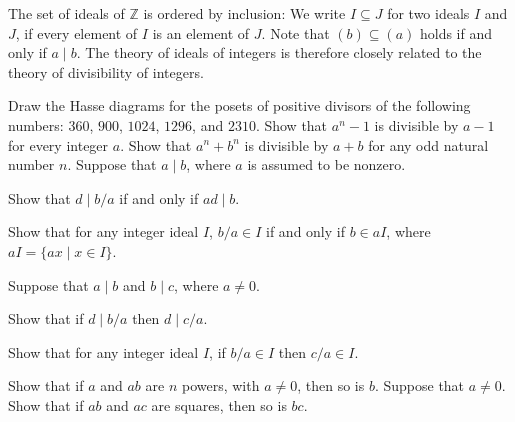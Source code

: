 The set of ideals of $\mathbb{Z}$ is ordered by inclusion: We write $I\subseteq J$ for two ideals $I$ and $J$, if every element of $I$ is an element of $J$. Note that $(b)\subseteq (a)$ holds if and only if $a\mid b$. The theory of ideals of integers is therefore closely related to the theory of divisibility of integers.

\exercises

\begin{starter}
  \exercise Draw the Hasse diagrams for the posets of positive divisors of the following numbers: $360$, $900$, $1024$, $1296$, and $2310$.
  \exercise Show that $a^n-1$ is divisible by $a-1$ for every integer $a$.
  \exercise Show that $a^n+b^n$ is divisible by $a+b$ for any odd natural number $n$.
  \exercise Suppose that $a\mid b$, where $a$ is assumed to be nonzero.
  \begin{subexenum}
  \item Show that $d\mid b/a$ if and only if $ad\mid b$.
  \item Show that for any integer ideal $I$, $b/a\in I$ if and only if $b\in aI$, where $aI=\{ax \mid x\in I\}$.
  \end{subexenum}
  \exercise Suppose that $a\mid b$ and $b\mid c$, where $a\neq 0$.
  \begin{subexenum}
  \item Show that if $d\mid b/a$ then $d\mid c/a$.
  \item Show that for any integer ideal $I$, if $b/a\in I$ then $c/a\in I$.
  \end{subexenum}
  \exercise Show that if $a$ and $ab$ are $n$\supth{} powers, with $a\neq 0$, then so is $b$.
  \exercise Suppose that $a\neq 0$. Show that if $ab$ and $ac$ are squares, then so is $bc$.  
\end{starter}

